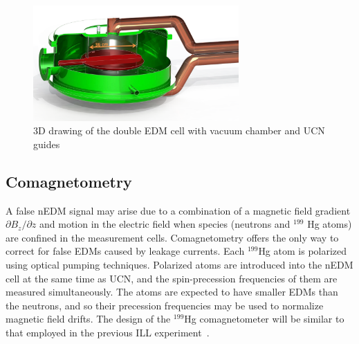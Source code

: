 \begin{figure}[h!]
  \centering
  \includegraphics[width=0.7\textwidth]{HVcell.png}
  \caption{3D drawing of the double EDM cell with vacuum chamber and
    UCN guides}
  \label{fig:HVcell}
\end{figure}



\subsection{Comagnetometry}
A false nEDM signal may arise due to a combination of a magnetic field
gradient $\partial {B_z}/\partial z$ and motion in the electric field when
species (neutrons and $^{199}$ Hg atoms) are confined in the
measurement cells. Comagnetometry offers the only way to correct for
false EDMs caused by leakage currents.  Each $^{199}$Hg atom is
polarized using optical pumping techniques. Polarized atoms are
introduced into the nEDM cell at the same time as UCN, and the
spin-precession frequencies of them are measured simultaneously. The
atoms are expected to have smaller EDMs than the neutrons, and so
their precession frequencies may be used to normalize magnetic field
drifts.  The design of the $^{199}$Hg comagnetometer will be similar
to that employed in the previous ILL
experiment~\cite{Baker2006,Griffith2009}.




